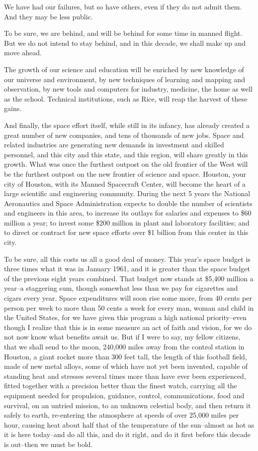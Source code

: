 \documentclass[a4paper]{amsbook}
\begin{document}
We have had our failures, but so have others, even if they do not admit them. And they may be less public.

To be sure, we are behind, and will be behind for some time in manned flight. But we do not intend to stay behind, and in this decade, we shall make up and move ahead.

The growth of our science and education will be enriched by new knowledge of our universe and environment, by new techniques of learning and mapping and observation, by new tools and computers for industry, medicine, the home as well as the school. Technical institutions, such as Rice, will reap the harvest of these gains.

And finally, the space effort itself, while still in its infancy, has already created a great number of new companies, and tens of thousands of new jobs. Space and related industries are generating new demands in investment and skilled personnel, and this city and this state, and this region, will share greatly in this growth. What was once the furthest outpost on the old frontier of the West will be the furthest outpost on the new frontier of science and space. Houston, your city of Houston, with its Manned Spacecraft Center, will become the heart of a large scientific and engineering community. During the next 5 years the National Aeronautics and Space Administration expects to double the number of scientists and engineers in this area, to increase its outlays for salaries and expenses to \$60 million a year; to invest some \$200 million in plant and laboratory facilities; and to direct or contract for new space efforts over \$1 billion from this center in this city.

To be sure, all this costs us all a good deal of money. This year's space budget is three times what it was in January 1961, and it is greater than the space budget of the previous eight years combined. That budget now stands at \$5,400 million a year–a staggering sum, though somewhat less than we pay for cigarettes and cigars every year. Space expenditures will soon rise some more, from 40 cents per person per week to more than 50 cents a week for every man, woman and child in the United States, for we have given this program a high national priority–even though I realize that this is in some measure an act of faith and vision, for we do not now know what benefits await us. But if I were to say, my fellow citizens, that we shall send to the moon, 240,000 miles away from the control station in Houston, a giant rocket more than 300 feet tall, the length of this football field, made of new metal alloys, some of which have not yet been invented, capable of standing heat and stresses several times more than have ever been experienced, fitted together with a precision better than the finest watch, carrying all the equipment needed for propulsion, guidance, control, communications, food and survival, on an untried mission, to an unknown celestial body, and then return it safely to earth, re-entering the atmosphere at speeds of over 25,000 miles per hour, causing heat about half that of the temperature of the sun–almost as hot as it is here today–and do all this, and do it right, and do it first before this decade is out–then we must be bold.
\end{document}
